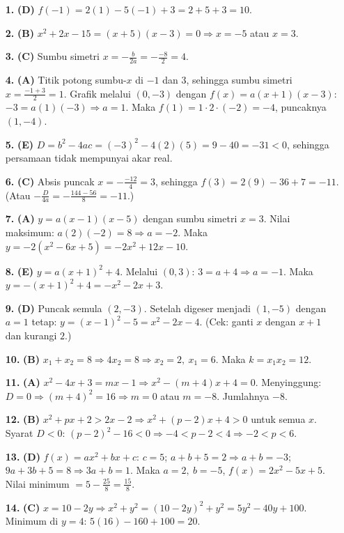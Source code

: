 \documentclass[a4paper,11pt]{article}
\newcommand{\dis}{\displaystyle}
\begin{document}
\small\begin{enumerate}[leftmargin=2em,itemsep=2pt,topsep=2pt]
\item[\textbf{1.}] \textbf{(D)} $f(-1)=2(1)-5(-1)+3=2+5+3=10$.
\item[\textbf{2.}] \textbf{(B)} $x^{2}+2x-15=(x+5)(x-3)=0\Rightarrow x=-5$ atau $x=3$.
\item[\textbf{3.}] \textbf{(C)} Sumbu simetri $x=-\dis\frac{b}{2a}=-\dis\frac{-8}{2}=4$.
\item[\textbf{4.}] \textbf{(A)} Titik potong sumbu-$x$ di $-1$ dan $3$, sehingga sumbu simetri $x=\dis\frac{-1+3}{2}=1$. Grafik melalui $(0,-3)$ dengan $f(x)=a(x+1)(x-3)$: $-3=a(1)(-3)\Rightarrow a=1$. Maka $f(1)=1\cdot2\cdot(-2)=-4$, puncaknya $(1,-4)$.
\item[\textbf{5.}] \textbf{(E)} $D=b^{2}-4ac=(-3)^{2}-4(2)(5)=9-40=-31<0$, sehingga persamaan tidak mempunyai akar real.
\item[\textbf{6.}] \textbf{(C)} Absis puncak $x=-\dis\frac{-12}{4}=3$, sehingga $f(3)=2(9)-36+7=-11$. (Atau $-\dis\frac{D}{4a}=-\dis\frac{144-56}{8}=-11$.)
\item[\textbf{7.}] \textbf{(A)} $y=a(x-1)(x-5)$ dengan sumbu simetri $x=3$. Nilai maksimum: $a(2)(-2)=8\Rightarrow a=-2$. Maka $y=-2(x^{2}-6x+5)=-2x^{2}+12x-10$.
\item[\textbf{8.}] \textbf{(E)} $y=a(x+1)^{2}+4$. Melalui $(0,3)$: $3=a+4\Rightarrow a=-1$. Maka $y=-(x+1)^{2}+4=-x^{2}-2x+3$.
\item[\textbf{9.}] \textbf{(D)} Puncak semula $(2,-3)$. Setelah digeser menjadi $(1,-5)$ dengan $a=1$ tetap: $y=(x-1)^{2}-5=x^{2}-2x-4$. (Cek: ganti $x$ dengan $x+1$ dan kurangi $2$.)
\item[\textbf{10.}] \textbf{(B)} $x_{1}+x_{2}=8\Rightarrow4x_{2}=8\Rightarrow x_{2}=2,\ x_{1}=6$. Maka $k=x_{1}x_{2}=12$.
\item[\textbf{11.}] \textbf{(A)} $x^{2}-4x+3=mx-1\Rightarrow x^{2}-(m+4)x+4=0$. Menyinggung: $D=0\Rightarrow(m+4)^{2}=16\Rightarrow m=0$ atau $m=-8$. Jumlahnya $-8$.
\item[\textbf{12.}] \textbf{(B)} $x^{2}+px+2>2x-2\Rightarrow x^{2}+(p-2)x+4>0$ untuk semua $x$. Syarat $D<0$: $(p-2)^{2}-16<0\Rightarrow-4<p-2<4\Rightarrow-2<p<6$.
\item[\textbf{13.}] \textbf{(D)} $f(x)=ax^{2}+bx+c$: $c=5$; $a+b+5=2\Rightarrow a+b=-3$; $9a+3b+5=8\Rightarrow3a+b=1$. Maka $a=2,\ b=-5$, $f(x)=2x^{2}-5x+5$. Nilai minimum $=5-\dis\frac{25}{8}=\dis\frac{15}{8}$.
\item[\textbf{14.}] \textbf{(C)} $x=10-2y\Rightarrow x^{2}+y^{2}=(10-2y)^{2}+y^{2}=5y^{2}-40y+100$. Minimum di $y=4$: $5(16)-160+100=20$.

\end{enumerate}
\end{document}
